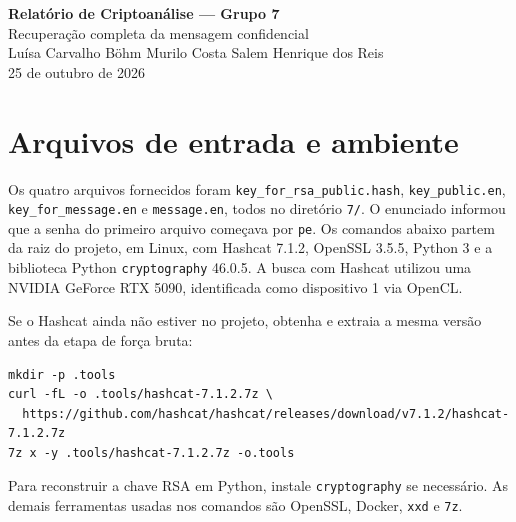 \documentclass[11pt,a4paper]{article}
\newcommand{\code}[1]{\texttt{#1}}
\begin{document}
\begin{center}
{\LARGE\bfseries\color{darkblue} Relatório de Criptoanálise --- Grupo 7}\\[0.6em]
{\large Recuperação completa da mensagem confidencial}\\[0.5em]
Luísa Carvalho Böhm \textbullet{} Murilo Costa Salem \textbullet{} Henrique dos Reis\\
25 de outubro de 2026
\end{center}

\begin{abstract}
Este relatório descreve, na ordem em que foram executadas, a descoberta da senha de acesso à chave pública, a decifragem AES dessa chave, a fatoração do módulo RSA, a reconstrução da chave privada, a recuperação da senha da mensagem e a decifragem do texto final. Inclui parâmetros, comandos reproduzíveis, tentativas malsucedidas e o código integral do script desenvolvido para a reconstrução RSA.
\end{abstract}

\tableofcontents
\newpage

\section{Arquivos de entrada e ambiente}

Os quatro arquivos fornecidos foram \code{key\_for\_rsa\_public.hash}, \code{key\_public.en}, \code{key\_for\_message.en} e \code{message.en}, todos no diretório \code{7/}. O enunciado informou que a senha do primeiro arquivo começava por \code{pe}. Os comandos abaixo partem da raiz do projeto, em Linux, com Hashcat 7.1.2, OpenSSL 3.5.5, Python 3 e a biblioteca Python \code{cryptography} 46.0.5. A busca com Hashcat utilizou uma NVIDIA GeForce RTX 5090, identificada como dispositivo 1 via OpenCL.

Se o Hashcat ainda não estiver no projeto, obtenha e extraia a mesma versão antes da etapa de força bruta:
\begin{Verbatim}[fontsize=\scriptsize]
mkdir -p .tools
curl -fL -o .tools/hashcat-7.1.2.7z \
  https://github.com/hashcat/hashcat/releases/download/v7.1.2/hashcat-7.1.2.7z
7z x -y .tools/hashcat-7.1.2.7z -o.tools
\end{Verbatim}
Para reconstruir a chave RSA em Python, instale \code{cryptography} se necessário. As demais ferramentas usadas nos comandos são OpenSSL, Docker, \code{xxd} e \code{7z}.
\end{document}

